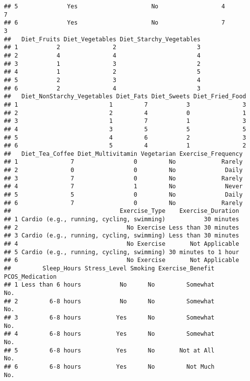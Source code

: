 \documentclass[
]{article}
\begin{document}
\begin{verbatim}
## 5              Yes                     No                  4                  7
## 6              Yes                     No                  7                  3
##   Diet_Fruits Diet_Vegetables Diet_Starchy_Vegetables
## 1           2               2                       3
## 2           4               4                       4
## 3           1               3                       2
## 4           1               2                       5
## 5           2               3                       4
## 6           2               4                       3
##   Diet_NonStarchy_Vegetables Diet_Fats Diet_Sweets Diet_Fried_Food
## 1                          1         7           3               3
## 2                          2         4           0               1
## 3                          1         7           1               3
## 4                          3         5           5               5
## 5                          4         6           2               3
## 6                          5         4           1               2
##   Diet_Tea_Coffee Diet_Multivitamin Vegetarian Exercise_Frequency
## 1               7                 0         No             Rarely
## 2               0                 0         No              Daily
## 3               7                 0         No             Rarely
## 4               7                 1         No              Never
## 5               5                 0         No              Daily
## 6               7                 0         No             Rarely
##                               Exercise_Type    Exercise_Duration
## 1 Cardio (e.g., running, cycling, swimming)           30 minutes
## 2                               No Exercise Less than 30 minutes
## 3 Cardio (e.g., running, cycling, swimming) Less than 30 minutes
## 4                               No Exercise       Not Applicable
## 5 Cardio (e.g., running, cycling, swimming) 30 minutes to 1 hour
## 6                               No Exercise       Not Applicable
##         Sleep_Hours Stress_Level Smoking Exercise_Benefit PCOS_Medication
## 1 Less than 6 hours           No      No         Somewhat             No.
## 2         6-8 hours           No      No         Somewhat             No.
## 3         6-8 hours          Yes      No         Somewhat             No.
## 4         6-8 hours          Yes      No         Somewhat             No.
## 5         6-8 hours          Yes      No       Not at All             No.
## 6         6-8 hours          Yes      No         Not Much             No.
\end{verbatim}
\end{document}
